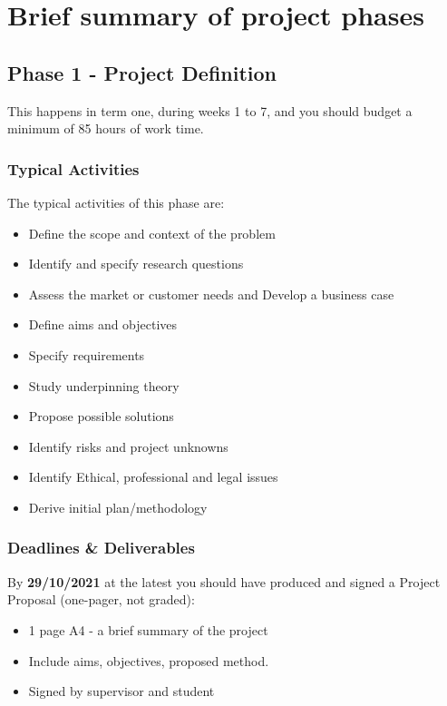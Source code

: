 \section{Brief summary of project phases}

\subsection{Phase 1 - Project Definition}

This happens in term one, during weeks 1 to 7, and you should budget a minimum of 85 hours of work time.

\subsubsection{Typical Activities}

The typical activities of this phase are:

\begin{itemize}
    \item Define the scope and context of the problem
    \item Identify and specify research questions
    \item Assess the market or customer needs and Develop a business case
    \item Define aims and objectives
    \item Specify requirements
    \item Study underpinning theory
    \item Propose possible solutions
    \item Identify risks and project unknowns
    \item Identify Ethical, professional and legal issues
    \item Derive initial plan/methodology
\end{itemize}

\subsubsection{Deadlines \& Deliverables}

By \textbf{29/10/2021} at the latest you should have produced and signed a Project Proposal (one-pager, not graded):

\begin{itemize}
    \item 1 page A4 - a brief summary of the project
    \item Include aims, objectives, proposed method.
    \item Signed by supervisor and student
\end{itemize}

